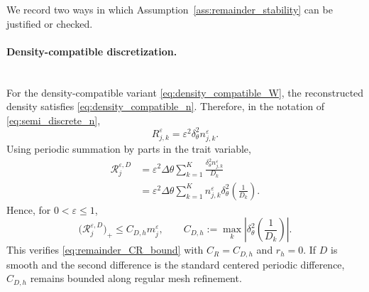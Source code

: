 \documentclass[11pt]{article}
\begin{document}
We record two ways in which Assumption~\ref{ass:remainder_stability} can be
justified or checked.

\paragraph{Density-compatible discretization.}\mbox{}\\
For the density-compatible variant \eqref{eq:density_compatible_W}, the
reconstructed density satisfies \eqref{eq:density_compatible_n}. Therefore, in
the notation of \eqref{eq:semi_discrete_n},
\[
    R_{j,k}^\varepsilon
    =
    \varepsilon^2\delta_\theta^2n_{j,k}^\varepsilon .
\]
Using periodic summation by parts in the trait variable,
\[
\begin{aligned}
    \mathcal R_j^{\varepsilon,D}
    &=
    \varepsilon^2\Delta\theta
    \sum_{k=1}^K
    \frac{\delta_\theta^2n_{j,k}^\varepsilon}{D_k}  \\
    &=
    \varepsilon^2\Delta\theta
    \sum_{k=1}^K
    n_{j,k}^\varepsilon
    \delta_\theta^2\left(\frac1{D_k}\right) .
\end{aligned}
\]
Hence, for \(0<\varepsilon\le1\),
\[
    \bigl(\mathcal R_j^{\varepsilon,D}\bigr)_+
    \le
    C_{D,h}m_j^\varepsilon,
    \qquad
    C_{D,h}:=
    \max_k
    \left|
    \delta_\theta^2\left(\frac1{D_k}\right)
    \right| .
\]
This verifies \eqref{eq:remainder_CR_bound} with
\(C_R=C_{D,h}\) and \(r_h=0\). If \(D\) is smooth and the second difference is
the standard centered periodic difference, \(C_{D,h}\) remains bounded along
regular mesh refinement.
\end{document}
